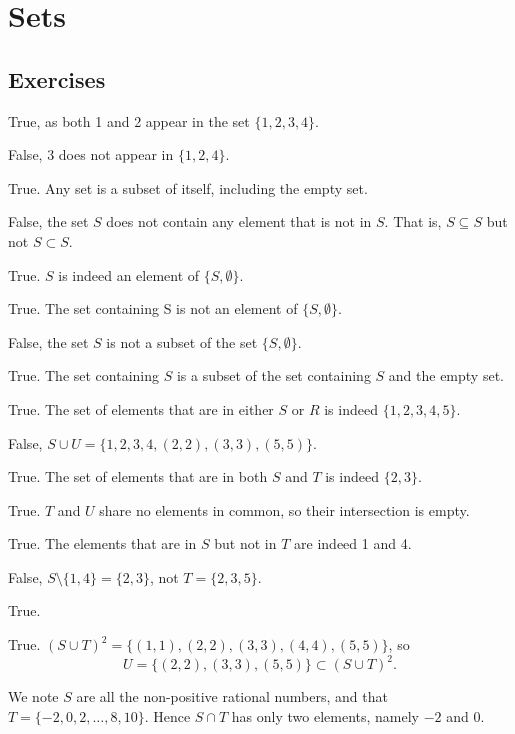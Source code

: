 \section{Sets}
\subsection*{Exercises}
\begin{questions}
    \item \begin{partquestions}{\alph*}
        \item True, as both 1 and 2 appear in the set $\{1, 2, 3, 4\}$.
        \item False, 3 does not appear in $\{1, 2, 4\}$.
        \item True. Any set is a subset of itself, including the empty set.
        \item False, the set $S$ does not contain any element that is not in $S$. That is, $S \subseteq S$ but not $S \subset S$.
        \item True. $S$ is indeed an element of $\{S, \emptyset\}$.
        \item True. The set containing S is not an element of $\{S, \emptyset\}$.
        \item False, the set $S$ is not a subset of the set $\{S, \emptyset\}$.
        \item True. The set containing $S$ is a subset of the set containing $S$ and the empty set.
    \end{partquestions}

    \item \begin{partquestions}{\alph*}
        \item True. The set of elements that are in either $S$ or $R$ is indeed $\{1, 2, 3, 4, 5\}$.
        \item False, $S \cup U = \{1, 2, 3, 4, (2, 2), (3, 3), (5, 5)\}$.
        \item True. The set of elements that are in both $S$ and $T$ is indeed $\{2, 3\}$.
        \item True. $T$ and $U$ share no elements in common, so their intersection is empty.
        \item True. The elements that are in $S$ but not in $T$ are indeed 1 and 4.
        \item False, $S \setminus \{1, 4\} = \{2, 3\}$, not $T = \{2, 3, 5\}$.
        \item True.
        \item True. $(S \cup T)^2 = \{(1,1), (2,2), (3,3), (4,4), (5,5)\}$, so
        \[
            U = \{(2,2), (3,3), (5,5)\} \subset (S \cup T)^2.
        \]
    \end{partquestions}

    \item We note $S$ are all the non-positive rational numbers, and that $T = \{-2, 0, 2, \dots, 8, 10\}$. Hence $S \cap T$ has only two elements, namely $-2$ and $0$.
\end{questions}

